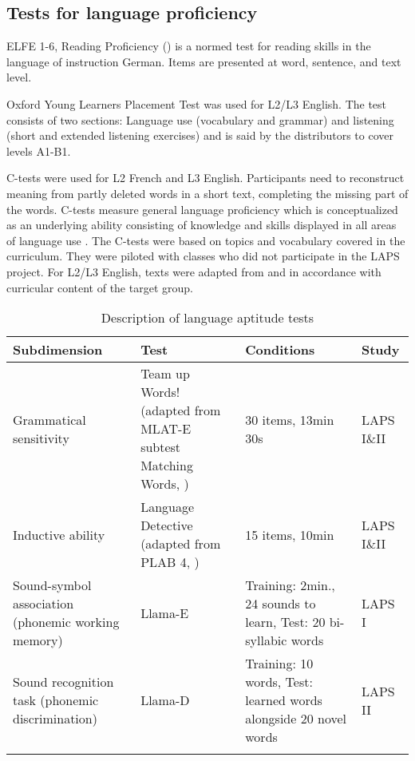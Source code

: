 \documentclass[output=paper]{langsci/langscibook}
\begin{document}
\subsection{Tests for language proficiency}
ELFE 1-6, Reading Proficiency (\citealt{LenhardSchneider2006}) is a normed test for reading skills in the language of instruction German. Items are presented at word, sentence, and text level.

Oxford Young Learners Placement Test \citep{Testing2013} was used for L2/L3 English. The test consists of two sections: Language use (vocabulary and grammar) and listening (short and extended listening exercises) and is said by the distributors to cover levels A1-B1.

C-tests were used for L2 French and L3 English. Participants need to reconstruct meaning from partly deleted words in a short text, completing the missing part of the words. C-tests measure general language proficiency which is conceptualized as an underlying ability consisting of knowledge and skills displayed in all areas of language use \citep{EckesGrotjahn2006}. The C-tests were based on topics and vocabulary covered in the curriculum. They were piloted with classes who did not participate in the LAPS project. For L2/L3 English, texts were adapted from \citet{BabaiiShahri2010} and \citet{WildenPorsch2017} in accordance with curricular content of the target group.

\begin{table}[p]\footnotesize
\begin{tabularx}{\textwidth}{QQQl}
\lsptoprule
{Subdimension} & {Test} & {Conditions} & {Study}\\\midrule
Grammatical sensitivity & Team up Words! (adapted from MLAT-E subtest Matching Words, \citealt{CarrollSapon2010}) & 30 items, 13min 30s & LAPS I\&II\\
Inductive ability & Language Detective (adapted from PLAB 4, \citealt{PimsleurEtAl2004}) & 15 items, 10min & LAPS I\&II\\
Sound-symbol association (phonemic working memory) & Llama-E \citep{MearaEtAl2001} & Training: 2min., 24 sounds to learn, Test: 20 bi-syllabic words & LAPS I\\
Sound recognition task (phonemic discrimination) & Llama-D \citep{MearaEtAl2001} & Training: 10 words, Test: learned words alongside 20 novel words & LAPS II\\
\lspbottomrule
\end{tabularx}
\caption{Description of language aptitude tests\label{tab:tests:part-1}}
\end{table}
\end{document}
